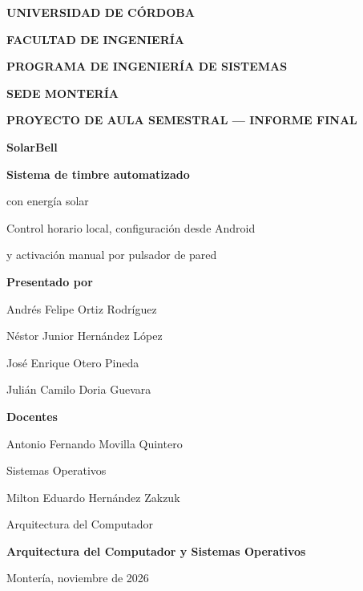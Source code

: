 \documentclass[a4paper,11pt]{article}
\begin{document}
\begin{titlepage}
\centering
\vspace*{1.12cm}
{\large\bfseries UNIVERSIDAD DE CÓRDOBA\par}
\vspace{0.27cm}
{\bfseries FACULTAD DE INGENIERÍA\par}
\vspace{0.25cm}
{\bfseries PROGRAMA DE INGENIERÍA DE SISTEMAS\par}
\vspace{0.25cm}
{\bfseries SEDE MONTERÍA\par}
\vfill
{\large\bfseries PROYECTO DE AULA SEMESTRAL --- INFORME FINAL\par}
\vspace{1.05cm}
{\LARGE\bfseries SolarBell\par}
\vspace{0.14cm}
{\LARGE\bfseries Sistema de timbre automatizado\par con energía solar\par}
\vspace{0.62cm}
{\color{azulgris}Control horario local, configuración desde Android\par
y activación manual por pulsador de pared\par}
\vfill
{\bfseries Presentado por\par}
\vspace{0.43cm}
Andrés Felipe Ortiz Rodríguez\par
Néstor Junior Hernández López\par
José Enrique Otero Pineda\par
Julián Camilo Doria Guevara\par
\vfill
{\bfseries Docentes\par}
\vspace{0.35cm}
Antonio Fernando Movilla Quintero\par
{\small Sistemas Operativos\par}
\vspace{0.21cm}
Milton Eduardo Hernández Zakzuk\par
{\small Arquitectura del Computador\par}
\vfill
{\bfseries Arquitectura del Computador y Sistemas Operativos\par}
\vspace{0.34cm}
Montería, noviembre de 2026\par
\vspace*{0.27cm}
\end{titlepage}
\end{document}

